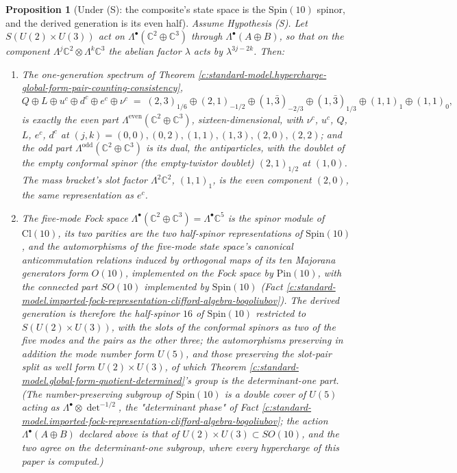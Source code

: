 \documentclass[11pt]{article}
\newtheorem{proposition}[theorem]{Proposition}
\theoremstyle{definition}
\theoremstyle{plain}
\newcommand{\changedmark}[2]{\marginpar{\raggedright\scriptsize\color{#1}#2}}
\providecommand{\C}{}\renewcommand{\C}{\mathbb{C}}
\providecommand{\Cl}{}\renewcommand{\Cl}{\mathrm{Cl}}
\begin{document}
\begin{proposition}[Under (S): the composite's state space is the $\mathrm{Spin}(10)$ spinor, and the derived generation is its even half]\label{c:standard-model.under-s-composites-state-space-spinor}
\changedmark{gray}{reworded}
Assume Hypothesis (S). Let $S(U(2) \times U(3))$ act on $\Lambda^{\bullet}(\C^{2} \oplus \C^{3})$ through $\Lambda^{\bullet}(A \oplus B)$, so that on the component $\Lambda^{j}\C^{2} \otimes \Lambda^{k}\C^{3}$ the abelian factor $\lambda$ acts by $\lambda^{3j - 2k}$. Then:
\begin{enumerate}
\item The one-generation spectrum of Theorem \ref{c:standard-model.hypercharge-global-form-pair-counting-consistency},
\[
Q \oplus L \oplus u^{c} \oplus d^{c} \oplus e^{c} \oplus \nu^{c}
\;=\; (2,3)_{1/6} \oplus (2,1)_{-1/2} \oplus (1,\bar{3})_{-2/3} \oplus (1,\bar{3})_{1/3} \oplus (1,1)_{1} \oplus (1,1)_{0},
\]
is exactly the even part $\Lambda^{\mathrm{even}}(\C^{2} \oplus \C^{3})$, sixteen-dimensional, with $\nu^{c}$, $u^{c}$, $Q$, $L$, $e^{c}$, $d^{c}$ at $(j, k) = (0,0), (0,2), (1,1), (1,3), (2,0), (2,2)$; and the odd part $\Lambda^{\mathrm{odd}}(\C^{2} \oplus \C^{3})$ is its dual, the antiparticles, with the doublet of the empty conformal spinor (the empty-twistor doublet) $(2,1)_{1/2}$ at $(1,0)$. The mass bracket's slot factor $\Lambda^{2}\C^{2}$, $(1,1)_{1}$, is the even component $(2,0)$, the same representation as $e^{c}$.
\item The five-mode Fock space $\Lambda^{\bullet}(\C^{2} \oplus \C^{3}) = \Lambda^{\bullet}\C^{5}$ is the spinor module of $\Cl(10)$, its two parities are the two half-spinor representations of $\mathrm{Spin}(10)$, and the automorphisms of the five-mode state space's canonical anticommutation relations induced by orthogonal maps of its ten Majorana generators form $O(10)$, implemented on the Fock space by $\mathrm{Pin}(10)$, with the connected part $SO(10)$ implemented by $\mathrm{Spin}(10)$ (Fact \ref{c:standard-model.imported-fock-representation-clifford-algebra-bogoliubov}). The derived generation is therefore the half-spinor $16$ of $\mathrm{Spin}(10)$ restricted to $S(U(2) \times U(3))$, with the slots of the conformal spinors as two of the five modes and the pairs as the other three; the automorphisms preserving in addition the mode number form $U(5)$, and those preserving the slot-pair split as well form $U(2) \times U(3)$, of which Theorem \ref{c:standard-model.global-form-quotient-determined}'s group is the determinant-one part. (The number-preserving subgroup of $\mathrm{Spin}(10)$ is a double cover of $U(5)$ acting as $\Lambda^{\bullet} \otimes \det^{-1/2}$, the "determinant phase" of Fact \ref{c:standard-model.imported-fock-representation-clifford-algebra-bogoliubov}; the action $\Lambda^{\bullet}(A \oplus B)$ declared above is that of $U(2) \times U(3) \subset SO(10)$, and the two agree on the determinant-one subgroup, where every hypercharge of this paper is computed.)

\end{enumerate}
\end{proposition}
\end{document}
